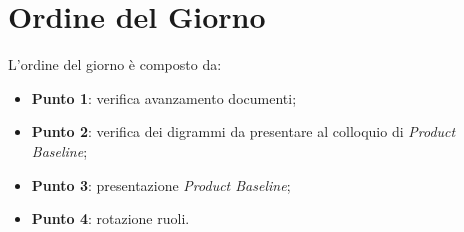 \section{Ordine del Giorno}
L'ordine del giorno è composto da: 
\begin{itemize}
	\item \textbf{Punto 1}: verifica avanzamento documenti;
	\item \textbf{Punto 2}: verifica dei digrammi da presentare al colloquio di \textit{Product Baseline};
	\item \textbf{Punto 3}: presentazione \textit{Product Baseline};
	\item \textbf{Punto 4}: rotazione ruoli.
\end{itemize}